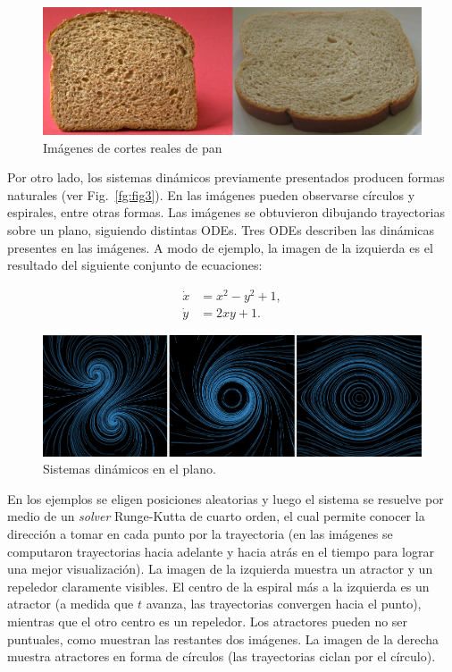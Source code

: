 \documentclass[spanish,a4paper,11pt,oneside,links]{report}
\begin{document}
\begin{figure}[htb!]
  \centerline{\includegraphics[scale=0.45]{panreal}}
  \caption{Im\'agenes de cortes reales de pan}
  \label{fg:panreal}
\end{figure}

Por otro lado, los sistemas din\'amicos previamente presentados producen formas naturales (ver Fig.~\ref{fg:fig3}). En las im\'agenes pueden observarse c\'irculos y espirales, entre otras formas. Las im\'agenes se obtuvieron dibujando trayectorias sobre un plano, siguiendo distintas ODEs. Tres ODEs describen las din\'amicas presentes en las im\'agenes. A modo de ejemplo, la imagen de la izquierda es el resultado del siguiente conjunto de ecuaciones:

\begin{equation} \label{eq:simple}  
  \begin{aligned}
    \dot{x} &= x^{2}-y^{2}+1,\\
    \dot{y} &= 2xy+1.
  \end{aligned}
\end{equation}


\begin{figure}[htb!]
  \centerline{\includegraphics[scale=0.28]{sistdin2}}
  \caption{Sistemas din\'amicos en el plano.}
  \label{fg:sistdin2}
\end{figure}

En los ejemplos se eligen posiciones aleatorias y luego el sistema se resuelve por medio de un {\em solver} Runge-Kutta de cuarto orden, el cual permite conocer la direcci\'on a tomar en cada punto por la trayectoria (en las im\'agenes se computaron trayectorias hacia adelante y hacia atrás en el tiempo para lograr una mejor visualizaci\'on). La imagen de la izquierda muestra un atractor y un repeledor claramente visibles. El centro de la espiral m\'as a la izquierda es un atractor (a medida que $t$ avanza, las trayectorias convergen hacia el punto), mientras que el otro centro es un repeledor. Los atractores pueden no ser puntuales, como muestran las restantes dos im\'agenes. La imagen de la derecha muestra atractores en forma de c\'irculos (las trayectorias ciclan por el c\'irculo).
\end{document}
